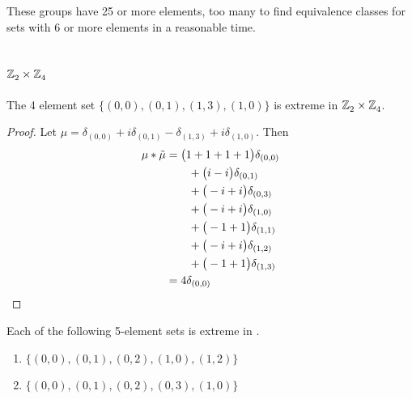 \subsection{}
These groups have 25 or more elements, too many to find equivalence classes for sets with 6 or more elements in a
reasonable time.


\subsection{$\texttt{$\mathbb Z_{2}^{\,}$}\times\texttt{$\mathbb Z_{4}^{\,}$}$}


\begin{prop}\label{prop4inZ2.X.Z4}
The 4 element set $\{(0, 0),  (0, 1),  (1, 3),  (1, 0) \}$ is extreme in $\texttt{$\mathbb Z_{2}^{\,}$} \times \texttt{$\mathbb Z_{4}^{\,}$}$. \newline \end{prop} 

 
\begin{proof}
Let  $\mu =  \delta_{(0,0)}+i\delta_{(0,1)}-\delta_{(1,3)}+i\delta_{(1,0)}
$.  Then 
\begin{align*} 
\mu * \tilde \mu & = \big(1+1+1+1\big)\delta_{(0,0)}
\\&\qquad
+\big(i-i\big)\delta_{(0,1)}
\\&\qquad
+\big(-i+i\big)\delta_{(0,3)}
\\&\qquad
+\big(-i+i\big)\delta_{(1,0)}
\\&\qquad
+\big(-1+1\big)\delta_{(1,1)}
\\&\qquad
+\big(-i+i\big)\delta_{(1,2)}
\\&\qquad
+\big(-1+1\big)\delta_{(1,3)}\\&=4\delta_{(0 , 0)}\qedhere
\end{align*}
\end{proof}



\begin{prop}\label{prop5inZ2.X.Z4}
Each of the following 5-element sets is extreme in \Times{}.
\begin{enumerate}

\item $\{(0, 0),  (0, 1),  (0, 2),  (1, 0),  (1, 2) \}$
\item $\{(0, 0),  (0, 1),  (0, 2),  (0, 3),  (1, 0) \}$ 
\end{enumerate}
 \end{prop} 
 
